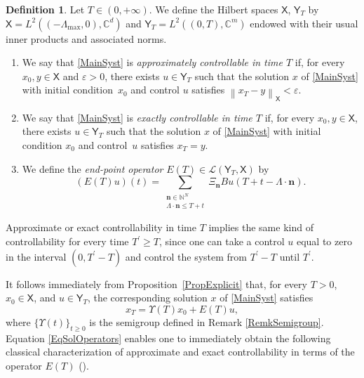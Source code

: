 \documentclass[JEP,XML,SOM,Unicode]{cedram}
\newcommand{\bn}{\boldsymbol{n}}
\theoremstyle{plain}
\theoremstyle{definition}
\newtheorem{defi}[theo]{Definition}
\newcommand{\norm}[1]{\left\lVert #1\right\lVert}
\begin{document}
\begin{defi}
\label{DefiContrExactApprox}
Let $T \in (0, +\infty)$. We define the Hilbert spaces $\mathsf X$, $\mathsf Y_T$ by $\mathsf X = L^2((-\Lambda_{\max}, 0), \mathbb C^d)$ and $\mathsf Y_T = L^2((0, T), \mathbb C^m)$ endowed with their usual inner products and associated norms.
\begin{enumerate}
\item We say that \eqref{MainSyst} is \emph{approximately controllable in time $T$} if, for every $x_0, y \in \mathsf X$ and $\varepsilon > 0$, there exists $u \in \mathsf Y_T$ such that the solution $x$ of \eqref{MainSyst} with initial condition~$x_0$ and control $u$ satisfies $\norm{x_T - y}_{\mathsf X} < \varepsilon$.

\item We say that \eqref{MainSyst} is \emph{exactly controllable in time $T$} if, for every $x_0, y \in \mathsf X$, there exists $u \in \mathsf Y_T$ such that the solution $x$ of \eqref{MainSyst} with initial condition $x_0$ and control~$u$ satisfies $x_T = y$.

\item We define the \emph{end-point operator} $E(T) \in \mathcal L(\mathsf Y_T, \mathsf X)$ by\vspace*{-3pt}
\begin{equation}
\label{EqDefET}
(E(T)u)(t) = \sum_{\substack{\bn \in \mathbb N^N \\ \Lambda \cdot \bn \leq T + t}} \Xi_{\bn} B u(T + t - \Lambda \cdot \bn).
\end{equation}
\end{enumerate}
\end{defi}

Approximate or exact controllability in time $T$ implies the same kind of controllability for every time $T^\prime \geq T$, since one can take a control $u$ equal to zero in the interval $(0, T^\prime - T)$ and control the system from $T^\prime - T$ until $T^\prime$.

It follows immediately from Proposition~\ref{PropExplicit} that, for every $T > 0$, $x_0 \in \mathsf X$, and $u \in \mathsf Y_T$, the corresponding solution $x$ of \eqref{MainSyst} satisfies\vspace*{-3pt}
\begin{equation}
\label{EqSolOperators}
x_T = \Upsilon(T) x_0 + E(T) u,
\end{equation}
where $\{\Upsilon(t)\}_{t \geq 0}$ is the semigroup defined in Remark \ref{RemkSemigroup}. Equation \eqref{EqSolOperators} enables one to immediately obtain the following classical characterization of approximate and exact controllability in terms of the operator $E(T)$ (\cf \cite[Lem.\,2.46]{Coron2007Control}).
\end{document}
